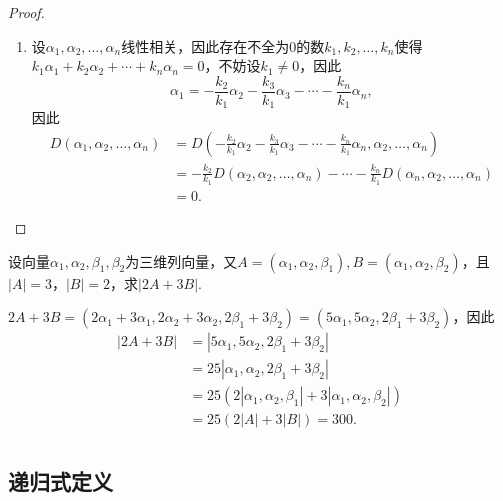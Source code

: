 \begin{proof}
\begin{enumerate}
        \item 设$\alpha_1,\alpha_2,\ldots,\alpha_n$线性相关，因此存在不全为0的数$k_1,k_2,\ldots,k_n$使得$k_1\alpha_1+k_2\alpha_2+\cdots+k_n\alpha_n=0$，不妨设$k_1 \neq 0$，因此
              \[\alpha_1=-\frac{k_2}{k_1}\alpha_2-\frac{k_3}{k_1}\alpha_3-\cdots-\frac{k_n}{k_1}\alpha_n,\]
              因此
              \begin{align*}
                  D(\alpha_1,\alpha_2,\ldots,\alpha_n) & =D(-\frac{k_2}{k_1}\alpha_2-\frac{k_3}{k_1}\alpha_3-\cdots-\frac{k_n}{k_1}\alpha_n,\alpha_2,\ldots,\alpha_n)     \\
                                                       & =-\frac{k_2}{k_1}D(\alpha_2,\alpha_2,\ldots,\alpha_n)-\cdots-\frac{k_n}{k_1}D(\alpha_n,\alpha_2,\ldots,\alpha_n) \\
                                                       & =0.
              \end{align*}
    \end{enumerate}
\end{proof}

\begin{example} \label{ex:13:公理化定义2}
    设向量$\alpha_1,\alpha_2,\beta_1,\beta_2$为三维列向量，又$A=(\alpha_1,\alpha_2,\beta_1),B=(\alpha_1,\alpha_2,\beta_2)$，且$|A|=3$，$|B|=2$，求$|2A+3B|$.
\end{example}

\begin{solution}
    $2A+3B=(2\alpha_1+3\alpha_1,2\alpha_2+3\alpha_2,2\beta_1+3\beta_2)=(5\alpha_1,5\alpha_2,2\beta_1+3\beta_2)$，因此
    \begin{align*}
        |2A+3B| & =|5\alpha_1,5\alpha_2,2\beta_1+3\beta_2|                       \\
                & =25|\alpha_1,\alpha_2,2\beta_1+3\beta_2|                       \\
                & =25(2|\alpha_1,\alpha_2,\beta_1|+3|\alpha_1,\alpha_2,\beta_2|) \\
                & =25(2|A|+3|B|)=300.                                            \\
    \end{align*}
\end{solution}

\subsection{递归式定义}

